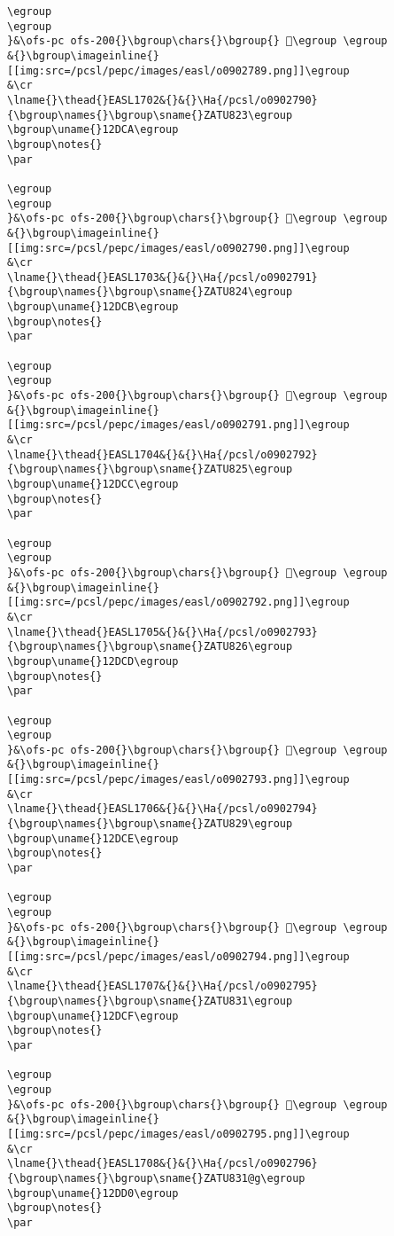 \begin{verbatim}
\egroup
\egroup
}&\ofs-pc ofs-200{}\bgroup\chars{}\bgroup{} 𒷉\egroup \egroup
&{}\bgroup\imageinline{}[[img:src=/pcsl/pepc/images/easl/o0902789.png]]\egroup
&\cr
\lname{}\thead{}EASL1702&{}&{}\Ha{/pcsl/o0902790}{\bgroup\names{}\bgroup\sname{}ZATU823\egroup
\bgroup\uname{}12DCA\egroup
\bgroup\notes{}
\par 

\egroup
\egroup
}&\ofs-pc ofs-200{}\bgroup\chars{}\bgroup{} 𒷊\egroup \egroup
&{}\bgroup\imageinline{}[[img:src=/pcsl/pepc/images/easl/o0902790.png]]\egroup
&\cr
\lname{}\thead{}EASL1703&{}&{}\Ha{/pcsl/o0902791}{\bgroup\names{}\bgroup\sname{}ZATU824\egroup
\bgroup\uname{}12DCB\egroup
\bgroup\notes{}
\par 

\egroup
\egroup
}&\ofs-pc ofs-200{}\bgroup\chars{}\bgroup{} 𒷋\egroup \egroup
&{}\bgroup\imageinline{}[[img:src=/pcsl/pepc/images/easl/o0902791.png]]\egroup
&\cr
\lname{}\thead{}EASL1704&{}&{}\Ha{/pcsl/o0902792}{\bgroup\names{}\bgroup\sname{}ZATU825\egroup
\bgroup\uname{}12DCC\egroup
\bgroup\notes{}
\par 

\egroup
\egroup
}&\ofs-pc ofs-200{}\bgroup\chars{}\bgroup{} 𒷌\egroup \egroup
&{}\bgroup\imageinline{}[[img:src=/pcsl/pepc/images/easl/o0902792.png]]\egroup
&\cr
\lname{}\thead{}EASL1705&{}&{}\Ha{/pcsl/o0902793}{\bgroup\names{}\bgroup\sname{}ZATU826\egroup
\bgroup\uname{}12DCD\egroup
\bgroup\notes{}
\par 

\egroup
\egroup
}&\ofs-pc ofs-200{}\bgroup\chars{}\bgroup{} 𒷍\egroup \egroup
&{}\bgroup\imageinline{}[[img:src=/pcsl/pepc/images/easl/o0902793.png]]\egroup
&\cr
\lname{}\thead{}EASL1706&{}&{}\Ha{/pcsl/o0902794}{\bgroup\names{}\bgroup\sname{}ZATU829\egroup
\bgroup\uname{}12DCE\egroup
\bgroup\notes{}
\par 

\egroup
\egroup
}&\ofs-pc ofs-200{}\bgroup\chars{}\bgroup{} 𒷎\egroup \egroup
&{}\bgroup\imageinline{}[[img:src=/pcsl/pepc/images/easl/o0902794.png]]\egroup
&\cr
\lname{}\thead{}EASL1707&{}&{}\Ha{/pcsl/o0902795}{\bgroup\names{}\bgroup\sname{}ZATU831\egroup
\bgroup\uname{}12DCF\egroup
\bgroup\notes{}
\par 

\egroup
\egroup
}&\ofs-pc ofs-200{}\bgroup\chars{}\bgroup{} 𒷏\egroup \egroup
&{}\bgroup\imageinline{}[[img:src=/pcsl/pepc/images/easl/o0902795.png]]\egroup
&\cr
\lname{}\thead{}EASL1708&{}&{}\Ha{/pcsl/o0902796}{\bgroup\names{}\bgroup\sname{}ZATU831@g\egroup
\bgroup\uname{}12DD0\egroup
\bgroup\notes{}
\par 


\end{verbatim}
